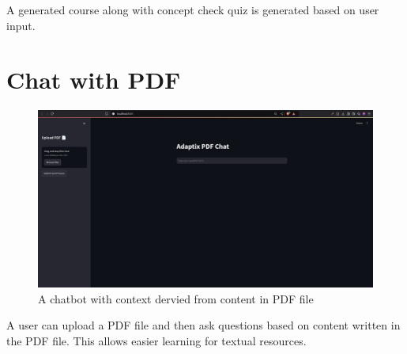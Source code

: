 A generated course along with concept check quiz is generated based on user input.
\newpage

\section{Chat with PDF}
\begin{figure}[H]
    \centering
    \includegraphics[scale=0.28]{Images/chat-with-pdf.jpeg}
    \caption{A chatbot with context dervied from content in PDF file}
    \label{fig:chat-with-pdf}
\end{figure}

A user can upload a PDF file and then ask questions based on content written in the PDF file.  
This allows easier learning for textual resources.
